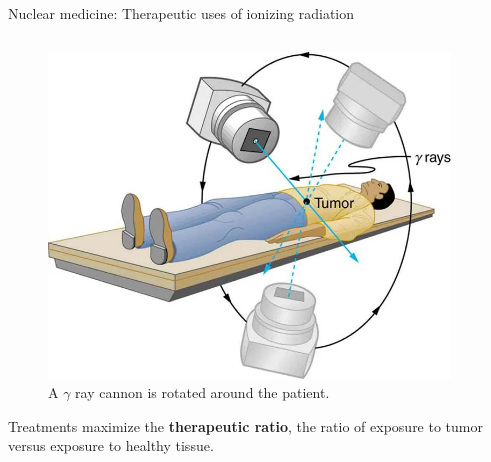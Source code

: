 \documentclass{beamer}
\begin{document}
\begin{frame}{Nuclear medicine: Therapeutic uses of ionizing radiation}
\begin{columns}[T]
\begin{column}{0.5\textwidth}
\begin{figure}
\includegraphics[width=0.95\textwidth]{figures/radiation_treatment.png}
\caption{\label{fig:treatment} \footnotesize A $\gamma$ ray cannon is rotated around the patient.}
\end{figure}
Treatments maximize the \textbf{therapeutic ratio}, the ratio of exposure to tumor versus exposure to healthy tissue.
\end{column}
\end{columns}
\end{frame}
\end{document}
